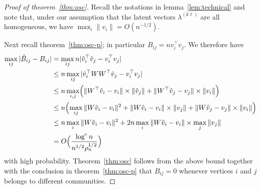 \documentclass[
  11pt,
]{article}
\theoremstyle{definition}
\theoremstyle{definition}
\theoremstyle{definition}
\theoremstyle{definition}
\theoremstyle{remark}
\begin{document}
\begin{proof}[Proof of theorem~\ref{thm:osc}]
Recall the notations in lemma~\ref{lem:technical} and note that,
under our assumption that the latent vectors $\lambda^{(k \ell)}$
are all homogeneous, we have $\max_{i} \|v_i\| =
O(n^{-1/2})$. 

Next recall theorem~\ref{thm:osc-p}; in particular $B_{ij} = nv_i^{\top}
v_j$. 
We therefore have
\[\begin{split}
 \max_{ij} |\hat{B}_{ij} - B_{ij}| &= \max_{ij} n |\hat{v}_i^\top \hat{v}_j -
v_i^\top v_j| \\
& \leq n \max_{ij} |\hat{v}_i^\top W W^\top \hat{v}_j -
v_i^\top v_j| \\
& \leq n \max_{i,j} \Bigl(\|W^{\top} \hat{v}_i - v_i\| \times \|\hat{v}_j\|
+ \|W^{\top} \hat{v}_j - v_j\| \times \|v_i\|\Bigr) \\
& \leq n \Bigl(\max_{ij}  \|W \hat{v}_i  - v_i \|^2 +  \|W
\hat{v}_i  - v_i \| \times \|v_j\| +  \|W \hat{v}_j  - v_j \| \times \|v_i\|\Bigr) 
\\ &
\leq n \max_{i} \|W \hat{v}_i  - v_i \|^2 + 2n \max_{i}
\|W \hat{v}_i  - v_i \| \times \max_{j} \|v_j\|
\\
& = O \Big( \frac{\log^{c}{n}}{n^{1/2} \rho_n^{1/2}} \Big)
\end{split}\]
with high probability.
Theorem~\ref{thm:osc} follows from the above bound together with the
conclusion in theorem~\ref{thm:osc-p} that $B_{ij} = 0$ whenever vertices $i$ and $j$
belongs to different communities. 
\end{proof}

\newpage

\renewcommand\refname{References}
  
\end{document}
